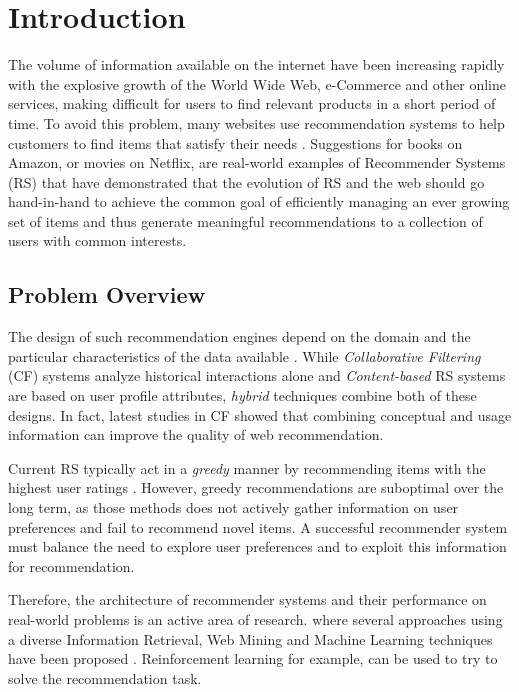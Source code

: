 \chapter{Introduction}
\label{chapterlabel1}

The volume of information available on the internet have been increasing rapidly with the explosive growth of the World Wide Web, e-Commerce and other online services, making difficult for users to find relevant products in a short period of time. To avoid this problem, many websites use recommendation systems to help customers to find items that satisfy their needs \cite{resnick1997recommender}. Suggestions for books on Amazon, or movies on Netflix, are real-world examples of Recommender Systems (RS) that have demonstrated that the evolution of RS and the web should go hand-in-hand to achieve the common goal of efficiently managing an ever growing set of items and  thus generate meaningful recommendations to a collection of users with common interests.

\section{Problem Overview}

The design of such recommendation engines depend on the domain and the particular characteristics of the data available \cite{melville2011recommender}. While \textit{Collaborative Filtering} (CF) systems analyze historical interactions alone and \textit{Content-based} RS systems are based on user profile attributes, \textit{hybrid} techniques combine both of these designs. In fact, latest studies in CF \cite{bobadilla2013recommender} showed that combining conceptual and usage information can improve the quality of web recommendation.

Current RS typically act in a \textit{greedy} manner by recommending items with the highest user ratings \cite{wang2014exploration}. However, greedy recommendations are suboptimal over the long term, as those methods does not actively gather information on user preferences and fail to recommend novel items. A successful recommender system must balance the need to explore user preferences and to exploit this information for recommendation.

Therefore, the architecture of recommender systems and their performance on real-world problems is an active area of research. where several approaches using a diverse Information Retrieval, Web Mining and Machine Learning techniques have been proposed \cite{bobadilla2013recommender}. Reinforcement learning \cite{sutton1998reinforcement} for example, can be used to try to solve the recommendation task. 

